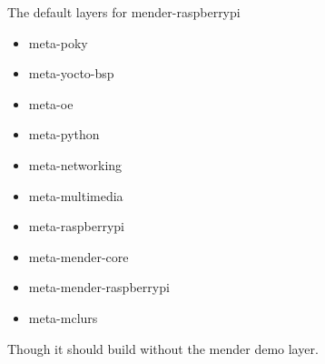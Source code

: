 \documentclass[../../main.tex]{subfiles}
\begin{document}
The default layers for mender-raspberrypi
\begin{itemize}
	\item meta-poky
	\item meta-yocto-bsp
	\item meta-oe
	\item meta-python
	\item meta-networking
	\item meta-multimedia
	\item meta-raspberrypi
	\item meta-mender-core
	\item meta-mender-raspberrypi
	\item meta-mclurs
\end{itemize}
Though it should build without the mender demo layer.
\end{document}

